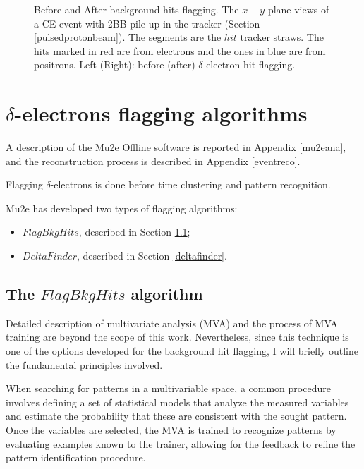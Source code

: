 \begin{figure}[!h]
\begin{subfigure}[b]{0.7\linewidth}
        \label{fig:af}
    \end{subfigure}
    \caption[Before and After background hits flagging.]{
        Before and After background hits flagging. 
        The $x-y$ plane views of a CE 
    event with 2BB pile-up in the tracker (Section \ref{pulsedprotonbeam}). 
    The segments are the $hit$ tracker straws. 
    The hits marked in
    red are from electrons and the ones in 
    blue are from positrons. Left (Right): before (after) $\delta$-electron hit flagging.}
    \label{fig:afbef} 
\end{figure}






\section{$\delta$-electrons flagging algorithms}
A description of the Mu2e Offline software 
is reported in Appendix \ref{mu2eana}, and the reconstruction 
process is described in Appendix \ref{eventreco}. 

Flagging $\delta$-electrons is done before time clustering 
and pattern recognition.

Mu2e has developed two types of flagging algorithms:
\begin{itemize}
    \item $FlagBkgHits$, described in Section \ref{flagbkghits};
    \item $DeltaFinder$, described in Section \ref{deltafinder}.
\end{itemize}

\subsection{The $FlagBkgHits$ algorithm}\label{flagbkghits}
Detailed description of multivariate 
analysis (MVA) and the 
process of MVA training are beyond the 
scope of this work. 
Nevertheless, since this technique is 
one of the options 
developed for the background hit flagging, I 
will briefly outline 
the fundamental principles involved.

When searching for patterns in a multivariable space, 
a common procedure involves 
defining a set of statistical 
models that analyze the measured 
variables and estimate 
the probability that these are consistent with the 
sought pattern. Once the variables are selected, 
the MVA is trained to recognize patterns by 
evaluating examples known to the trainer, 
allowing for the feedback to refine the 
pattern identification procedure.

